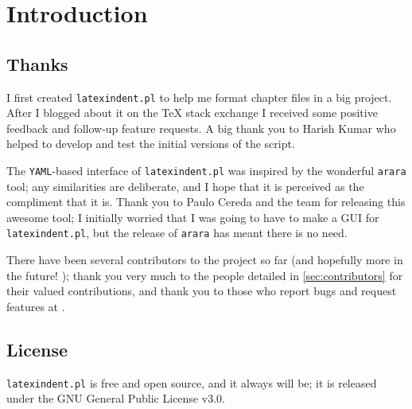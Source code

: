 \section{Introduction}
\subsection{Thanks}
	I first created \texttt{latexindent.pl} to help me format chapter files in a big project.
	After I blogged about it on the \TeX{} stack exchange \cite{cmhblog} I received some positive feedback and follow-up feature requests.
	A big thank you to Harish Kumar \cite{harish} who helped to develop and test the initial versions of the script.

	The \texttt{YAML}-based interface of \texttt{latexindent.pl} was inspired by the wonderful \texttt{arara} tool; any similarities are deliberate, and I hope that it is perceived as the compliment that it is.
	Thank you to Paulo Cereda and the team for releasing this awesome tool; I initially worried that I was going to have to make a GUI for \texttt{latexindent.pl}, but the release of \texttt{arara} has meant there is no need.

	There have been several contributors to the project so far (and hopefully more in the future!
	); thank you very much to the people detailed in \vref{sec:contributors}
	for their valued contributions, and thank you to those who report bugs and request features
	at \cite{latexindent-home}.

\subsection{License}
	\texttt{latexindent.pl} is free and open source, and it always will be; it is released under the GNU General Public License v3.0.

